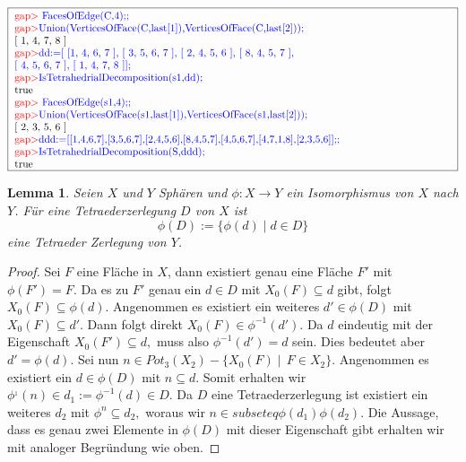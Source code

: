 \documentclass[12pt,titlepage,twoside,cleardoublepage]{article}
\theoremstyle{nummermitklammern}
\newtheorem{lemma}[temp]{Lemma}
\newtheorem{lemma}[zahl]{Lemma}
\numberwithin{equation}{section}
\begin{document}
 \begin{center}
 $\fbox{
\parbox{15cm}{
\textcolor{red}{gap$>$} \textcolor{blue}{FacesOfEdge(C,4);;}\newline 
\textcolor{red}{gap$>$}\textcolor{blue}{Union(VerticesOfFace(C,last[1]),VerticesOfFace(C,last[2]));}
\newline
 [ 1, 4, 7, 8 ]\newline 
\textcolor{red}{gap$>$}\textcolor{blue}{dd:=[ [1, 4, 6, 7 ], [ 3, 5, 6, 7 ], [ 2, 4, 5, 6 ], [ 8, 4, 5, 7 ],$ \newline $ [ 4, 5, 6, 7 ], [ 1,
4, 7, 8 ]];}\newline 
\textcolor{red}{gap$>$}\textcolor{blue}{ IsTetrahedrialDecomposition(s1,dd);}\newline 
true\newline 
\textcolor{red}{gap$>$} \textcolor{blue}{FacesOfEdge(s1,4);;}\newline 
\textcolor{red}{gap$>$}\textcolor{blue}{Union(VerticesOfFace(s1,last[1]),VerticesOfFace(s1,last[2]));}
\newline [ 2, 3, 5, 6 ]\newline 
\textcolor{red}{gap$>$}\textcolor{blue}{ddd:=[[1,4,6,7],[3,5,6,7],[2,4,5,6],[8,4,5,7],[4,5,6,7],[4,7,1,8],[2,3,5,6]];;}\newline 
\textcolor{red}{gap$>$}\textcolor{blue}{IsTetrahedrialDecomposition(S,ddd);}\newline 
true
 }}$
 \end{center}
\begin{lemma}
Seien $X$ und $Y$ Sphären und $\phi:X\to Y$ ein Isomorphismus von $X$ nach $Y$. Für eine Tetraederzerlegung $D$ von $X$ ist \[
\phi(D):=\{\phi(d)\mid d\in D\}
\] eine Tetraeder Zerlegung von $Y$.
\end{lemma}
\begin{proof}
Sei $F$ eine Fläche in $X$, dann existiert genau eine Fläche $F'$ mit $\phi(F')=F.$
 Da es zu $F'$ genau ein $d\in D$ mit $X_0(F) \subseteq d$ gibt, folgt $X_0(F)\subseteq \phi(d).$
  Angenommen es existiert ein weiteres $d'\in \phi(D)$ mit $X_0(F)\subseteq d'$. Dann folgt direkt $X_0(F)\in \phi^{-1}(d').$
   Da $d$ eindeutig mit der Eigenschaft $X_0(F')\subseteq d,$ muss also $\phi^{-1}(d')=d$ sein. Dies bedeutet aber $d'=\phi(d).$ Sei nun $n\in Pot_3(X_2)-\{X_0(F)\mid \,F \in X_2\}.$ Angenommen es existiert ein $d\in \phi(D)$ mit $n\subseteq d.$ Somit erhalten wir $\phi^{_1}(n)\in d_1:=\phi^{-1}(d)\in D.$ Da  $D$ eine Tetraederzerlegung ist existiert ein weiteres $d_2$ mit $\phi^{n}\subseteq d_2,$ woraus wir $n\in subseteq \phi(d_1)\phi(d_2).$ Die Aussage, dass es genau zwei Elemente in $\phi(D)$ mit dieser Eigenschaft gibt erhalten wir mit analoger Begründung wie oben.  
\end{proof}
\end{document}
